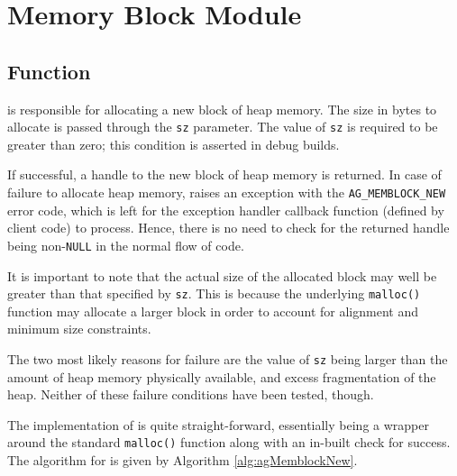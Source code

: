 \chapter{Memory Block Module}
\newpage


%
%
\section{Function \agMemblockNew}

\agMemblockNew  is responsible for allocating a new block of heap memory. The 
size in bytes to allocate is passed through the \verb|sz| parameter. The value 
of \verb|sz| is required to be greater than zero; this condition is asserted in 
debug builds.

If successful, a handle to the new block of heap memory is returned. In case of 
failure to allocate heap memory, \agMemblockNew raises an exception with the 
\verb|AG_MEMBLOCK_NEW| error code, which is left for the exception handler 
callback function (defined by client code) to process. Hence, there is no need 
to check for the returned handle being non-\verb|NULL| in the normal 
flow of code.

It is important to note that the actual size of the allocated block may well be
greater than that specified by \verb|sz|. This is because the underlying
\verb|malloc()| function may allocate a larger block in order to account for
alignment and minimum size constraints.


The two most likely reasons for failure are the value of \texttt{sz} being
larger than the amount of heap memory physically available, and excess
fragmentation of the heap. Neither of these failure conditions have been tested,
though.

The implementation of \agMemblockNew is quite straight-forward, essentially
being a wrapper around the standard \verb|malloc()| function along with an
in-built check for success. The algorithm for \agMemblockNew is given by 
Algorithm \ref{alg:agMemblockNew}.

